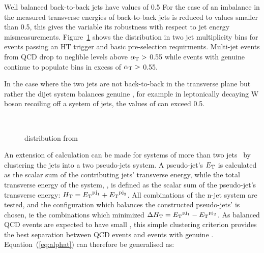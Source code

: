 Well balanced back-to-back jets have \alphat values of 0.5 
For the case of an imbalance in the measured transverse energies 
of back-to-back jets \alphat is reduced to values smaller than 0.5, 
this gives the variable its robustness with respect to jet energy 
mismeasurements. Figure~\ref{fig:alphat_dist} shows the \alphat 
distribution in two jet multiplicity bins for events passing 
an HT trigger and basic pre-selection requirments. Multi-jet 
events from QCD drop to neglible levels above $\alpha_{\text{T}}>$ 0.55
while events with genuine \met continue to populate bins in excess
of  $\alpha_{\text{T}}>$ 0.55.

In the case where the two 
jets are not back-to-back in the transverse plane but rather the 
dijet system balances genuine \met, for example in leptonically 
decaying W boson recoiling off a syetem of jets, the values of 
\alphat can exceed 0.5.

\begin{figure}[h!t]
  \begin{center}
     \\
    \caption{\alphat distribution from~\cite{RA1Paper2012} }
    \label{fig:alphat_dist}
  \end{center}
\end{figure}

An extension of \alphat calculation can be made for systems of 
more than two jets~\cite{cms-pas-sus-09001} by clustering the jets into a 
two pseudo-jets system. A pseudo-jet's ${E_{\text T}}$ is calculated
as the scalar sum of the contributing jets' transverse energy, while the total
transverse energy of the system, \scalht, is defined as the scalar sum of the 
pseudo-jet's transverse energy: $\mbox{$H_\text{T}$} = {E_{\text T}}^{{\rm pj}_1}+{E_{\text T}}^{{\rm pj}_2}$.
All combinations of the n-jet system are tested, and the configuration which
balances the constructed pseudo-jets' \Et is chosen, ie the combinations which
minimized $\Delta\mbox{$H_\text{T}$} = {E_{\text T}}^{{\rm pj}_1}-{E_{\text T}}^{{\rm pj}_2}$. As balanced QCD events
are expected to have small \dht, this simple clustering criterion provides the best
separation between QCD events and events with genuine \met. 
Equation~(\ref{eq:alphat}) can therefore be generalised as:

